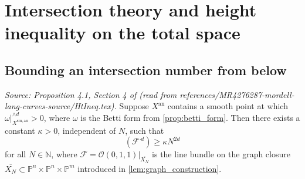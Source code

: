 \section{Intersection theory and height inequality on the total space}

\subsection{Bounding an intersection number from below}

\begin{lemma}
  \label{lem:siu_intersection_lower}
  \textit{Source: Proposition 4.1, Section 4 of \cite{MR4276287-mordell-lang-curves} (read from references/MR4276287-mordell-lang-curves-source/HtIneq.tex).}
  Suppose \(X^{\mathrm{an}}\) contains a smooth point at which
  \(\omega|_{X^{\mathrm{sm,an}}}^{\wedge d} > 0\),
  where \(\omega\) is the Betti form from \cref{prop:betti_form}.
  Then there exists a constant \(\kappa > 0\), independent of \(N\), such that
  \[
    (\mathcal{F}^{\cdot d}) \ge \kappa N^{2d}
  \]
  for all \(N \in \mathbb{N}\), where
  \(\mathcal{F} = \mathcal{O}(0,1,1)|_{\overline{X_N}}\) is the line bundle on the
  graph closure \(\overline{X_N} \subset \mathbb{P}^n \times \mathbb{P}^n \times \mathbb{P}^m\)
  introduced in \cref{lem:graph_construction}.
\end{lemma}

